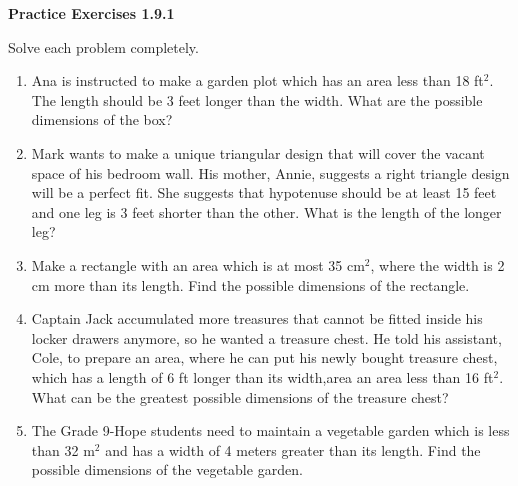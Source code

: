 \noindent\textbf{Practice Exercises 1.9.1}


Solve each problem completely. 
\begin{enumerate}[label = \color{blue}\arabic*. ]
\item Ana is instructed to make a garden plot which has an area less than 18 ft$^{2}$. The length should be 3 feet longer than the width. What are the possible dimensions of the box? 


\item Mark wants to make a unique triangular design that will cover the vacant space of his bedroom wall. His mother, Annie, suggests a right triangle design will be a perfect fit. She suggests that hypotenuse should be at least 15 feet and one leg is 3 feet shorter than the other. What is the length of the longer leg? 
\item Make a rectangle with an area which is at most 35 cm$^{2}$, where the width is 2 cm more than its length. Find the possible dimensions of the rectangle. 
\item Captain Jack accumulated more treasures that cannot be fitted inside his locker drawers anymore, so he wanted a treasure chest. He told his assistant, Cole, to prepare an area, where he can put his newly bought treasure chest, which has a length of 6 ft longer than its width,area an area less than 16 ft$^{2}$. What can be the greatest possible dimensions of the treasure chest? 
\item The Grade 9-Hope students need to maintain a vegetable garden which is less than 32 m$^{2}$ and has a width of 4 meters greater than its length. Find the possible dimensions of the vegetable garden. 
\end{enumerate}

